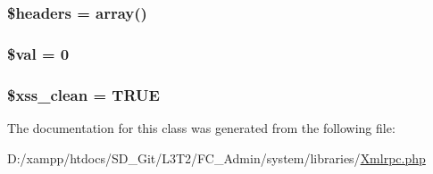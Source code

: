 \subsubsection[{\$headers}]{\setlength{\rightskip}{0pt plus 5cm}\$headers = array()}\label{class_x_m_l___r_p_c___response_a52500036ee807241b8b4b7e2367c49ef}
\hypertarget{class_x_m_l___r_p_c___response_aac81a74a7b30767af29bfd9a695636df}{}
\subsubsection[{\$val}]{\setlength{\rightskip}{0pt plus 5cm}\$val = 0}\label{class_x_m_l___r_p_c___response_aac81a74a7b30767af29bfd9a695636df}
\hypertarget{class_x_m_l___r_p_c___response_a0f2ee8861c0b3164a5c6e126dd98c0cc}{}
\subsubsection[{\$xss\+\_\+clean}]{\setlength{\rightskip}{0pt plus 5cm}\$xss\+\_\+clean = T\+R\+U\+E}\label{class_x_m_l___r_p_c___response_a0f2ee8861c0b3164a5c6e126dd98c0cc}


The documentation for this class was generated from the following file\+:\begin{DoxyCompactItemize}
\item 
D\+:/xampp/htdocs/\+S\+D\+\_\+\+Git/\+L3\+T2/\+F\+C\+\_\+\+Admin/system/libraries/\hyperlink{_xmlrpc_8php}{Xmlrpc.\+php}\end{DoxyCompactItemize}

